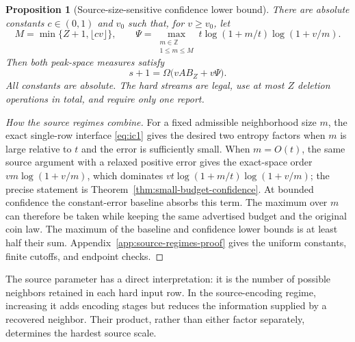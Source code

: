 \documentclass[11pt,letterpaper]{article}
\newtheorem{proposition}[theorem]{Proposition}
\numberwithin{equation}{section}
\begin{document}
\begin{proposition}[Source-size-sensitive confidence lower bound]
\label{prop:nearlinear-source-bound}
There are absolute constants $c\in(0,1)$ and $v_0$ such that, for $v\ge v_0$, let
\begin{equation}
M=\min\{Z+1,\lfloor cv\rfloor\},\qquad
 \Psi=\max_{\substack{m\in\mathbb Z\\1\le m\le M}}
       t\log(1+m/t)\log(1+v/m).
 \label{eq:forest-ne1}
\end{equation}
Then both peak-space measures satisfy
\begin{equation}
s+1=\Omega\bigl(vAB_Z+v\Psi\bigr).
 \label{eq:forest-ne2}
\end{equation}
All constants are absolute.
The hard streams are legal, use at most $Z$ deletion operations in total, and require only one report.
\end{proposition}
\begin{proof}[How the source regimes combine]
For a fixed admissible neighborhood size $m$, the exact single-row interface \eqref{eq:ic1} gives the desired two entropy factors when $m$ is large relative to $t$ and the error is sufficiently small.
When $m=O(t)$, the same source argument with a relaxed positive error gives the exact-space order $vm\log(1+v/m)$, which dominates $vt\log(1+m/t)\log(1+v/m)$; the precise statement is Theorem~\ref{thm:small-budget-confidence}.
At bounded confidence the constant-error baseline absorbs this term.
The maximum over $m$ can therefore be taken while keeping the same advertised budget and the original coin law.
The maximum of the baseline and confidence lower bounds is at least half their sum.
Appendix~\ref{app:source-regimes-proof} gives the uniform constants, finite cutoffs, and endpoint checks.
\end{proof}

The source parameter has a direct interpretation: it is the number of possible neighbors retained in each hard input row.
In the source-encoding regime, increasing it adds encoding stages but reduces the information supplied by a recovered neighbor.
Their product, rather than either factor separately, determines the hardest source scale.
\end{document}
